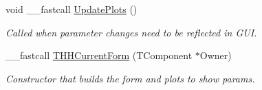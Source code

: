 \begin{DoxyCompactItemize}
\item 
\hypertarget{class_t_h_h_current_form_a61b7d438d75f3d595483dc19c11f1a7b}{void \+\_\+\+\_\+fastcall \hyperlink{class_t_h_h_current_form_a61b7d438d75f3d595483dc19c11f1a7b}{Update\+Plots} ()}\label{class_t_h_h_current_form_a61b7d438d75f3d595483dc19c11f1a7b}

\begin{DoxyCompactList}\small\item\em Called when parameter changes need to be reflected in G\+U\+I. \end{DoxyCompactList}\item 
\hypertarget{class_t_h_h_current_form_a31b1200632d593492821cb2f54ce2319}{\+\_\+\+\_\+fastcall \hyperlink{class_t_h_h_current_form_a31b1200632d593492821cb2f54ce2319}{T\+H\+H\+Current\+Form} (T\+Component $\ast$Owner)}\label{class_t_h_h_current_form_a31b1200632d593492821cb2f54ce2319}

\begin{DoxyCompactList}\small\item\em Constructor that builds the form and plots to show params. \end{DoxyCompactList}\end{DoxyCompactItemize}
